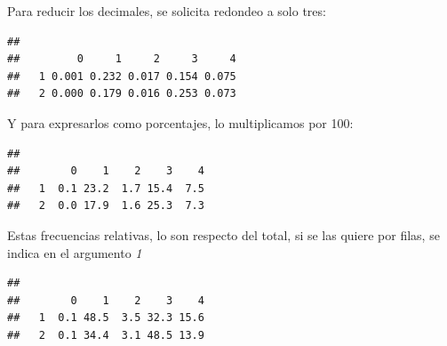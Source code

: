 \documentclass[]{book}
\newenvironment{Shaded}{\begin{snugshade}}{\end{snugshade}}
\newcommand{\DecValTok}[1]{\textcolor[rgb]{0.00,0.00,0.81}{#1}}
\newcommand{\FloatTok}[1]{\textcolor[rgb]{0.00,0.00,0.81}{#1}}
\newcommand{\KeywordTok}[1]{\textcolor[rgb]{0.13,0.29,0.53}{\textbf{#1}}}
\newcommand{\NormalTok}[1]{#1}
\newcommand{\OperatorTok}[1]{\textcolor[rgb]{0.81,0.36,0.00}{\textbf{#1}}}
\newcommand{\StringTok}[1]{\textcolor[rgb]{0.31,0.60,0.02}{#1}}
\begin{document}
Para reducir los decimales, se solicita redondeo a solo tres:

\begin{Shaded}
\end{Shaded}

\begin{verbatim}
##    
##         0     1     2     3     4
##   1 0.001 0.232 0.017 0.154 0.075
##   2 0.000 0.179 0.016 0.253 0.073
\end{verbatim}

Y para expresarlos como porcentajes, lo multiplicamos por 100:

\begin{Shaded}
\end{Shaded}

\begin{verbatim}
##    
##        0    1    2    3    4
##   1  0.1 23.2  1.7 15.4  7.5
##   2  0.0 17.9  1.6 25.3  7.3
\end{verbatim}

Estas frecuencias relativas, lo son respecto del total, si se las quiere por filas, se indica en el argumento \emph{1}

\begin{Shaded}
\end{Shaded}

\begin{verbatim}
##    
##        0    1    2    3    4
##   1  0.1 48.5  3.5 32.3 15.6
##   2  0.1 34.4  3.1 48.5 13.9
\end{verbatim}
\end{document}
